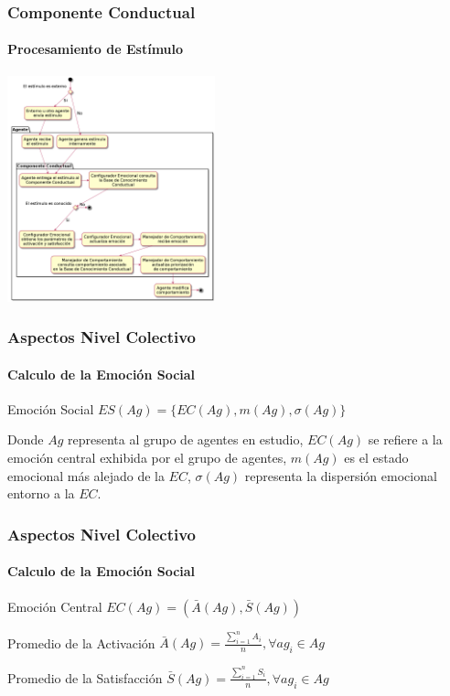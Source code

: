 \documentclass{beamer}
\begin{document}
\begin{frame}
\frametitle{Componente Conductual}
\framesubtitle{Procesamiento de Estímulo}
\centering
\includegraphics[width=6cm]{ilustraciones/procesamiento-estimulo}
\end{frame}

\begin{frame}
\frametitle{Aspectos Nivel Colectivo}
\framesubtitle{Calculo de la Emoción Social}
\begin{exampleblock}{Emoción Social}
$ES(Ag) = \{EC(Ag), m(Ag), \sigma(Ag)\}$
\end{exampleblock}

Donde $Ag$ representa al grupo de agentes en estudio, $EC(Ag)$ se refiere a la
emoción central exhibida por el grupo de agentes, $m(Ag)$ es el estado emocional
más alejado de la $EC$, $\sigma(Ag)$ representa la dispersión emocional entorno
a la $EC$.
\end{frame}

\begin{frame}
\frametitle{Aspectos Nivel Colectivo}
\framesubtitle{Calculo de la Emoción Social}
\begin{exampleblock}{Emoción Central}
$EC(Ag) = (\bar A(Ag), \bar S(Ag))$
\end{exampleblock}

\begin{exampleblock}{Promedio de la Activación}
$\bar A(Ag)=\frac{\sum_{i=1}^n A_i}{n}, \forall ag_i \in Ag$ \\
\end{exampleblock}

\begin{exampleblock}{Promedio de la Satisfacción}
$\bar S(Ag)=\frac{\sum_{i=1}^n S_i}{n}, \forall ag_i \in Ag$
\end{exampleblock}

\end{frame}
\end{document}
